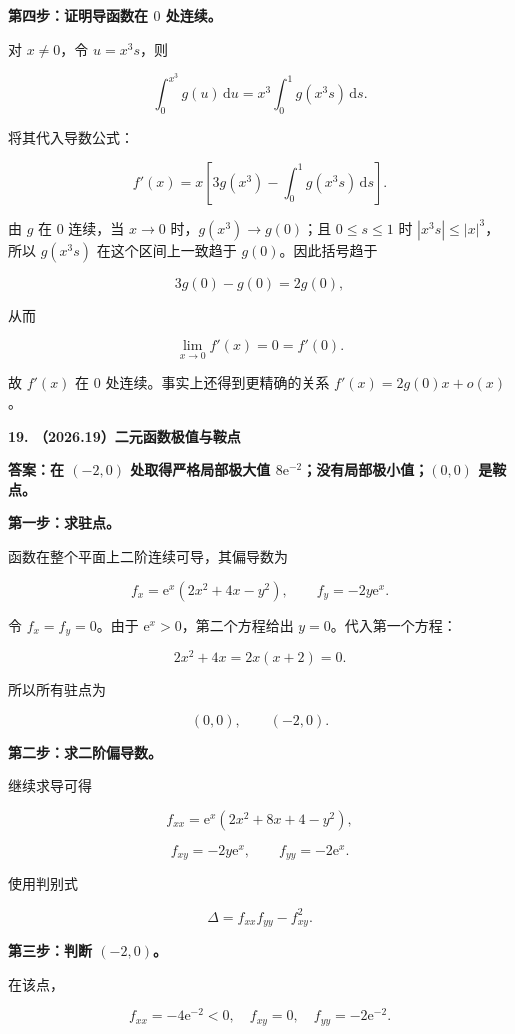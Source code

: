 \documentclass[UTF8,11pt,fontset=windows]{ctexart}
\begin{document}
\textbf{第四步：证明导函数在 $0$ 处连续。}

对 $x\ne0$，令 $u=x^3s$，则

$$
\int_0^{x^3}g(u)\,\mathrm{d}u
=x^3\int_0^1g(x^3s)\,\mathrm{d}s.
$$

将其代入导数公式：

$$
f'(x)=x\left[3g(x^3)-\int_0^1g(x^3s)\,\mathrm{d}s\right].
$$

由 $g$ 在 $0$ 连续，当 $x\to0$ 时，$g(x^3)\to g(0)$；且 $0\le s\le1$ 时 $|x^3s|\le|x|^3$，所以 $g(x^3s)$ 在这个区间上一致趋于 $g(0)$。因此括号趋于

$$
3g(0)-g(0)=2g(0),
$$

从而

$$
\lim_{x\to0}f'(x)=0=f'(0).
$$

故 $f'(x)$ 在 $0$ 处连续。事实上还得到更精确的关系 $f'(x)=2g(0)x+o(x)$。

\clearpage

\textbf{19. （2026.19）二元函数极值与鞍点}

\textbf{答案：在 $(-2,0)$ 处取得严格局部极大值 $8\mathrm{e}^{-2}$；没有局部极小值；$(0,0)$ 是鞍点。}

\textbf{第一步：求驻点。}

函数在整个平面上二阶连续可导，其偏导数为

$$
f_x=\mathrm{e}^x(2x^2+4x-y^2),
\qquad
f_y=-2y\mathrm{e}^x.
$$

令 $f_x=f_y=0$。由于 $\mathrm{e}^x>0$，第二个方程给出 $y=0$。代入第一个方程：

$$
2x^2+4x=2x(x+2)=0.
$$

所以所有驻点为

$$
(0,0),\qquad(-2,0).
$$

\textbf{第二步：求二阶偏导数。}

继续求导可得

$$
f_{xx}=\mathrm{e}^x(2x^2+8x+4-y^2),
$$

$$
f_{xy}=-2y\mathrm{e}^x,
\qquad
f_{yy}=-2\mathrm{e}^x.
$$

使用判别式

$$
\Delta=f_{xx}f_{yy}-f_{xy}^2.
$$

\textbf{第三步：判断 $(-2,0)$。}

在该点，

$$
f_{xx}=-4\mathrm{e}^{-2}<0,
\quad f_{xy}=0,
\quad f_{yy}=-2\mathrm{e}^{-2}.
$$
\end{document}
